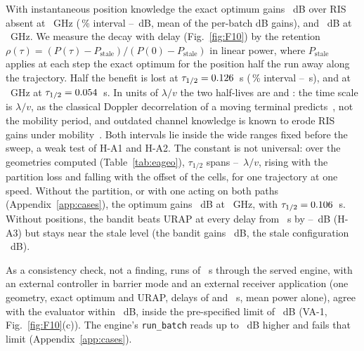 With instantaneous position knowledge the exact optimum gains
\numEaGainOpt~dB over RIS absent at \numEaFcOneGHz~GHz (\numCiPct\,\% interval
\numEaGainOptLo--\numEaGainOptHi~dB, mean of the per-batch dB gains), and \numEaGainOptTwo~dB
at \numEaFcTwoGHz~GHz. We measure the decay with delay (Fig.~\ref{fig:F10}) by the retention
$\rho(\tau)=(P(\tau)-P_{\mathrm{stale}})/(P(0)-P_{\mathrm{stale}})$ in linear power, where
$P_{\mathrm{stale}}$ applies at each step the exact optimum for the position half the run away
along the trajectory. Half the benefit
is lost at $\tau_{1/2}=0.126$~s (\numCiPct\,\% interval
\numEaTauHalfLo--\numEaTauHalfHi~s), and at \numEaFcTwoGHz~GHz at
$\tau_{1/2}=0.054$~s. In units of $\lambda/v$ the two half-lives are
\numEaTauOverLambdaV{} and \numEaTauOverLambdaVTwo: the time scale is $\lambda/v$, as the
classical Doppler decorrelation of a moving terminal predicts~\cite{Clarke1968,Jakes1974}, not
the mobility period, and outdated channel knowledge is known to erode RIS gains under
mobility~\cite{Papazafeiropoulos2023Aging,Zhang2022OutdatedCSI}. Both intervals lie inside the
wide ranges fixed before the sweep, a weak test of H-A1 and H-A2. The constant is not universal:
over the \numEaGeometries{} geometries computed (Table~\ref{tab:eageo}), $\tau_{1/2}$ spans
\numEaTauLambdaVMin--\numEaTauLambdaVMax~$\lambda/v$, rising with the partition loss and
falling with the offset of the cells, for one trajectory at one speed. Without the partition,
or with one acting on both paths (Appendix~\ref{app:cases}), the optimum gains
\numEaGainAzero~dB at \numEaFcOneGHz~GHz, with $\tau_{1/2}=0.106$~s. Without
positions, the
bandit beats URAP
at every delay from \numEaTauBanditMinS~s by \numEaBanditMinDb--\numEaBanditMaxDb~dB (H-A3) but
stays near the stale level (the bandit gains \numEaGainBandit~dB, the stale configuration
\numEaGainStale~dB).

As a consistency check, not a finding, \numVaOneRows{} runs of
\numVaOneDurS~s through the served engine, with an external controller in barrier mode and an
external receiver application (one geometry, exact optimum and URAP, delays of
\numVaOneTauMinS{} and \numVaOneTauMaxS~s, mean power alone), agree with the evaluator within
\numVaOneMaxDiffDb~dB, inside the pre-specified limit of \numVaOneTolDb~dB (VA-1,
Fig.~\ref{fig:F10}(c)). The engine's \texttt{run\_batch} reads up to \numVaOneLeftMaxDb~dB
higher and fails that limit (Appendix~\ref{app:cases}).

\begin{figure}[t]
\centering
{}
\end{figure}

